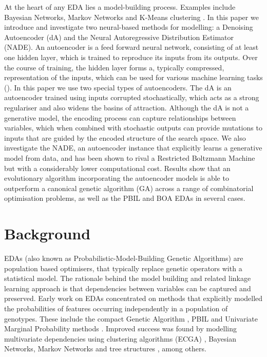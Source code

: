 \documentclass[twoside]{article}
\begin{document}
At the heart of any EDA lies a model-building process. Examples include Bayesian Networks, Markov Networks and K-Means clustering \cite{pelikan2002survey}. In this paper we introduce and investigate two neural-based methods for modelling: a Denoising Autoencoder (dA) and the Neural Autoregressive Distribution Estimator (NADE). An autoencoder is a feed forward neural network, consisting of at least one hidden layer, which is trained to reproduce its inputs from its outputs. Over the course of training, the hidden layer forms a, typically compressed, representation of the inputs, which can be used for various machine learning tasks (\cite{hinton2006reducing}). In this paper we use two special types of autoencoders. The dA is an autoencoder trained using inputs corrupted stochastically, which acts as a strong regulariser and also widens the basins of attraction. Although the dA is not a generative model, the encoding process can capture relationships between variables, which when combined with stochastic outputs can provide mutations to inputs that are guided by the encoded structure of the search space. %
We also investigate the NADE, an autoencoder instance that explicitly learns a generative model from data, and has been shown to rival a Restricted Boltzmann Machine but with a considerably lower computational cost. Results show that an evolutionary algorithm incorporating the autoencoder models is able to outperform a canonical genetic algorithm (GA) across a range of combinatorial optimisation problems, as well as the PBIL and BOA EDAs in several cases.

\section{Background}

EDAs (also known as Probabilistic-Model-Building Genetic Algorithms) are population based optimisers, that typically replace genetic operators with a statistical model. The rationale behind the model building and related linkage learning approach is that dependencies between variables can be captured and preserved. Early work on EDAs concentrated on methods that explicitly modelled the probabilities of features occurring independently in a population of genotypes. These include the compact Genetic Algorithm \cite{harik1999compact}, PBIL \cite{baluja1994population} and Univariate Marginal Probability methods \cite{pelikan2002survey}. Improved success was found by modelling multivariate dependencies using clustering algorithms (ECGA) \cite{harik1999linkage}, Bayesian Networks, Markov Networks and tree structures \cite{pelikan2002survey}, among others.
\end{document}
